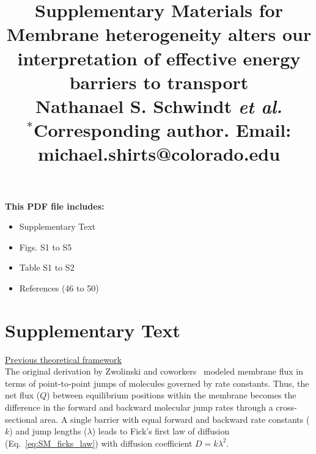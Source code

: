 
\topmargin 0.0cm
\oddsidemargin 0.2cm
\textwidth 16cm 
\textheight 21cm
\footskip 1.0cm

\newcommand{\parfrac}[2]{\left( \frac{#1}{#2} \right)}
\newcommand{\lami}[1]{\lambda_{#1}}

\renewcommand\thefigure{S\arabic{figure}}
\renewcommand\thetable{S\arabic{table}}
\renewcommand\theequation{S\arabic{equation}}

\setcounter{figure}{0}
\setcounter{equation}{0}
\setcounter{page}{1}

\title{ {\Large Supplementary Materials for} \\
{\large \textbf{Membrane heterogeneity alters our interpretation of effective energy barriers to transport}} \\
{\normalsize Nathanael S. Schwindt \textit{et al.}} \\
{\small $^\ast$Corresponding author. Email: michael.shirts@colorado.edu} }

\author{}
\date{}

\baselineskip24pt
\maketitle

\noindent \textbf{This PDF file includes:}

\begin{itemize}[noitemsep]
    \item[] Supplementary Text
    \item[] Figs. S1 to S5
    \item[] Table S1 to S2
    \item[] References (46 to 50)
\end{itemize}

\clearpage
\pagebreak

\section*{Supplementary Text}

\underline{Previous theoretical framework} \\
The original derivation by Zwolinski and coworkers~\cite{zwolinski_diffusion_1949} modeled membrane flux in terms of point-to-point jumps of molecules governed by rate constants. Thus, the net flux ($Q$) between equilibrium positions within the membrane becomes the difference in the forward and backward molecular jump rates through a cross-sectional area. A single barrier with equal forward and backward rate constants ($k$) and jump lengths ($\lambda$) leads to Fick's first law of diffusion (Eq.~\ref{eq:SM_ficks_law}) with diffusion coefficient $D = k\lambda^2$.


